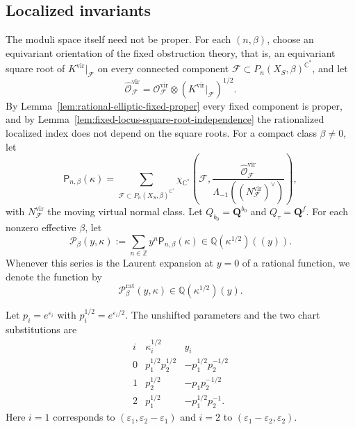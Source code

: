 \documentclass{amsart}
\theoremstyle{definition}
\numberwithin{equation}{section}
\newcommand{\C}{\mathbb C}
\newcommand{\Q}{\mathbb Q}
\newcommand{\Z}{\mathbb Z}
\newcommand{\eps}{\varepsilon}
\begin{document}
\subsection{Localized invariants}
The moduli space itself need not be proper.  For each \((n,\beta)\), choose an equivariant orientation of the fixed obstruction theory, that is, an equivariant square root of \(K^{\mathrm{vir}}|_{\mathscr F}\) on every connected component \(\mathscr F\subset P_n(X_S,\beta)^{\C^*}\), and let
\[
 \widehat{\mathcal O}^{\mathrm{vir}}_{\mathscr F}
 =\mathcal O^{\mathrm{vir}}_{\mathscr F}
  \otimes(K^{\mathrm{vir}}|_{\mathscr F})^{1/2}.
\]
By Lemma~\ref{lem:rational-elliptic-fixed-proper} every fixed component is proper, and by Lemma~\ref{lem:fixed-locus-square-root-independence} the rationalized localized index does not depend on the square roots.  For a compact class \(\beta\ne0\), let
\begin{equation}
 \mathsf P_{n,\beta}(\kappa)
 =\sum_{\mathscr F\subset P_n(X_S,\beta)^{\C^*}}
 \chi_{\C^*}\left(
  \mathscr F,
  \frac{\widehat{\mathcal O}^{\mathrm{vir}}_{\mathscr F}}
       {\Lambda_{-1}((N_{\mathscr F}^{\mathrm{vir}})^\vee)}
 \right),
\label{eq:rational-elliptic-localized-PT}
\end{equation}
with \(N_{\mathscr F}^{\mathrm{vir}}\) the moving virtual normal class.  Let \(Q_{b_0}=\mathbf Q^{b_0}\) and \(Q_\tau=\mathbf Q^f\).  For each nonzero effective \(\beta\), let
\begin{equation}
 \mathcal P_\beta(y,\kappa)
 :=\sum_{n\in\Z}y^n\mathsf P_{n,\beta}(\kappa)
 \in\Q(\kappa^{1/2})((y)).
\label{eq:rational-elliptic-fixed-class-series}
\end{equation}
Whenever this series is the Laurent expansion at \(y=0\) of a rational function, we denote the function by
\begin{equation}
 \mathcal P_\beta^{\mathrm{rat}}(y,\kappa)
 \in\Q(\kappa^{1/2})(y).
\label{eq:rational-elliptic-rationality}
\end{equation}

Let \(p_i=e^{\eps_i}\) with \(p_i^{1/2}=e^{\eps_i/2}\).  The unshifted parameters and the two chart substitutions are
\begin{equation}
\begin{array}{c|cc}
 i&\kappa_i^{1/2}&y_i\\ \hline
 0&p_1^{1/2}p_2^{1/2}&-p_1^{1/2}p_2^{-1/2}\\
 1&p_2^{1/2}&-p_1p_2^{-1/2}\\
 2&p_1^{1/2}&-p_1^{1/2}p_2^{-1}.
\end{array}
\label{eq:rational-elliptic-refined-variables}
\end{equation}
Here \(i=1\) corresponds to \((\eps_1,\eps_2-\eps_1)\) and \(i=2\) to \((\eps_1-\eps_2,\eps_2)\).
\end{document}
